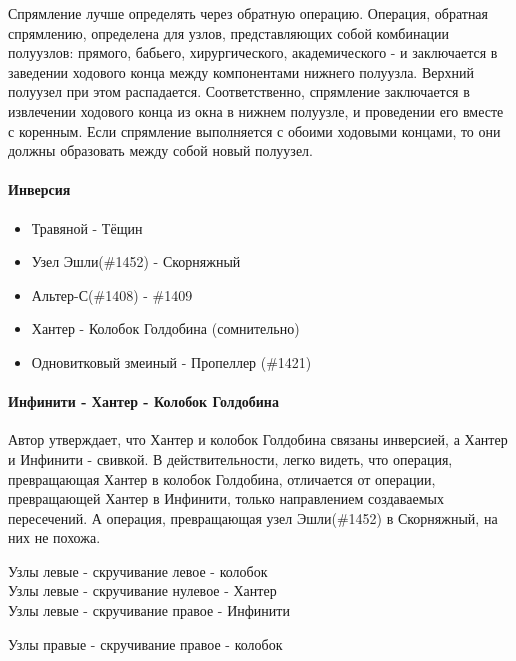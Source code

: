 Спрямление лучше определять через обратную операцию. Операция, обратная спрямлению, определена для узлов, представляющих собой комбинации полуузлов: прямого, бабьего, хирургического, академического - и заключается в заведении ходового конца между компонентами нижнего полуузла. Верхний полуузел при этом распадается.
Соответственно, спрямление заключается в извлечении ходового конца из окна в нижнем полуузле, и проведении его вместе с коренным. Если спрямление выполняется с обоими ходовыми концами, то они должны образовать между собой новый полуузел.

\paragraph{Инверсия}
\begin{itemize}
\item Травяной - Тёщин
\item Узел Эшли(\#1452) - Скорняжный 
\item Альтер-С(\#1408) - \#1409
\item Хантер - Колобок Голдобина (сомнительно)
\item Одновитковый змеиный - Пропеллер (\#1421)
\end{itemize}


\paragraph{Инфинити - Хантер - Колобок Голдобина}
Автор утверждает, что Хантер и колобок Голдобина связаны инверсией, а Хантер и Инфинити - свивкой.
В действительности, легко видеть, что операция, превращающая Хантер в колобок Голдобина, отличается от операции, превращающей Хантер в Инфинити, только направлением создаваемых пересечений. А операция, превращающая узел Эшли(\#1452) в Скорняжный, на них не похожа.

Узлы левые - скручивание левое - колобок\\
Узлы левые - скручивание нулевое - Хантер\\
Узлы левые - скручивание правое - Инфинити

Узлы правые - скручивание правое - колобок



